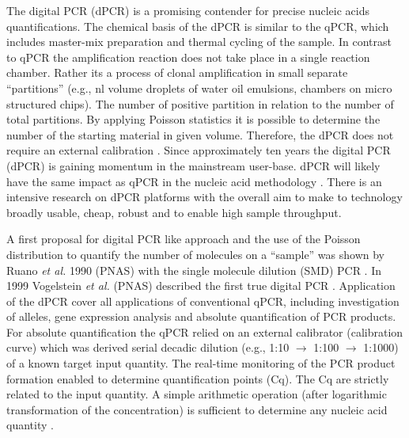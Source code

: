 \documentclass[a4,center,fleqn]{NAR}
\begin{document}
The digital PCR (dPCR) is a promising contender for precise nucleic acids 
quantifications. The chemical basis of the dPCR is similar to the qPCR, which 
includes master-mix preparation and thermal cycling of the sample. In contrast 
to qPCR the amplification reaction does not take place in a single reaction 
chamber. Rather its a process of clonal amplification in small separate 
``partitions'' (e.g., nl volume droplets of water oil emulsions, chambers on 
micro structured chips). The number of positive partition in relation to the 
number of total partitions. By applying Poisson statistics it is possible to 
determine the number of the starting material in given volume. Therefore, the 
dPCR does not require an external calibration \cite{selck_increased_2013, 
rodiger_r_2015}. Since approximately ten years the digital PCR (dPCR) is gaining 
momentum in the mainstream user-base. dPCR will likely have the same impact as 
qPCR in the nucleic acid methodology \cite{huggett_qpcr_2015, 
morley_digital_2014, rodiger_r_2015}. There is an intensive research on dPCR 
platforms with the overall aim to make to technology broadly usable, cheap, 
robust and to enable high sample throughput.

\enlargethispage{-65.1pt}

A first proposal for digital PCR like approach and the use of the Poisson 
distribution to quantify the number of molecules on a ``sample'' was shown by 
Ruano \textit{et al.} 1990 (PNAS) with the single molecule dilution (SMD) PCR \cite{ruano_haplotype_1990}. In 1999 
Vogelstein \textit{et al.} (PNAS) described the first true digital PCR \cite{vogelstein_digital_1999}. Application of 
the dPCR cover all applications of conventional qPCR, including investigation of 
alleles, gene expression analysis and absolute quantification of PCR products. 
For absolute quantification the qPCR relied on an external calibrator 
(calibration curve) which was derived serial decadic dilution (e.g., 1:10 $\rightarrow$ 
1:100 $\rightarrow$ 1:1000) of a known target input quantity. The real-time monitoring of 
the PCR product formation enabled to determine quantification points (Cq). The 
Cq are strictly related to the input quantity. A simple arithmetic operation 
(after logarithmic transformation of the concentration) is sufficient to 
determine any nucleic acid quantity \cite{huggett_considerations_2014}.
\end{document}
